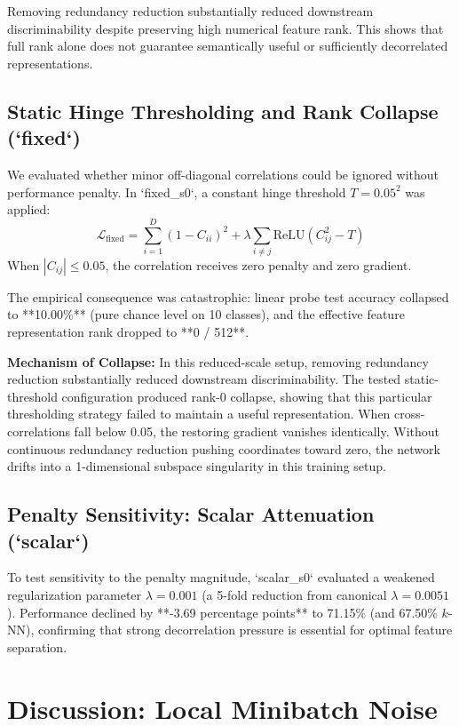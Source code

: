 \documentclass[conference]{IEEEtran}
\begin{document}
Removing redundancy reduction substantially reduced downstream discriminability despite preserving high numerical feature rank. This shows that full rank alone does not guarantee semantically useful or sufficiently decorrelated representations.

\subsection{Static Hinge Thresholding and Rank Collapse (`fixed`)}
We evaluated whether minor off-diagonal correlations could be ignored without performance penalty. In `fixed_s0`, a constant hinge threshold $T = 0.05^2$ was applied:
\begin{equation}
    \mathcal{L}_{\text{fixed}} = \sum_{i=1}^D (1 - C_{ii})^2 + \lambda \sum_{i \ne j} \text{ReLU}(C_{ij}^2 - T)
\end{equation}
When $|C_{ij}| \le 0.05$, the correlation receives zero penalty and zero gradient.

The empirical consequence was catastrophic: linear probe test accuracy collapsed to **10.00\%** (pure chance level on 10 classes), and the effective feature representation rank dropped to **0 / 512**. 

\textbf{Mechanism of Collapse:} In this reduced-scale setup, removing redundancy reduction substantially reduced downstream discriminability. The tested static-threshold configuration produced rank-0 collapse, showing that this particular thresholding strategy failed to maintain a useful representation. When cross-correlations fall below 0.05, the restoring gradient vanishes identically. Without continuous redundancy reduction pushing coordinates toward zero, the network drifts into a 1-dimensional subspace singularity in this training setup.

\subsection{Penalty Sensitivity: Scalar Attenuation (`scalar`)}
To test sensitivity to the penalty magnitude, `scalar_s0` evaluated a weakened regularization parameter $\lambda = 0.001$ (a 5-fold reduction from canonical $\lambda = 0.0051$). Performance declined by **-3.69 percentage points** to 71.15\% (and 67.50\% $k$-NN), confirming that strong decorrelation pressure is essential for optimal feature separation.

\section{Discussion: Local Minibatch Noise}
\end{document}
